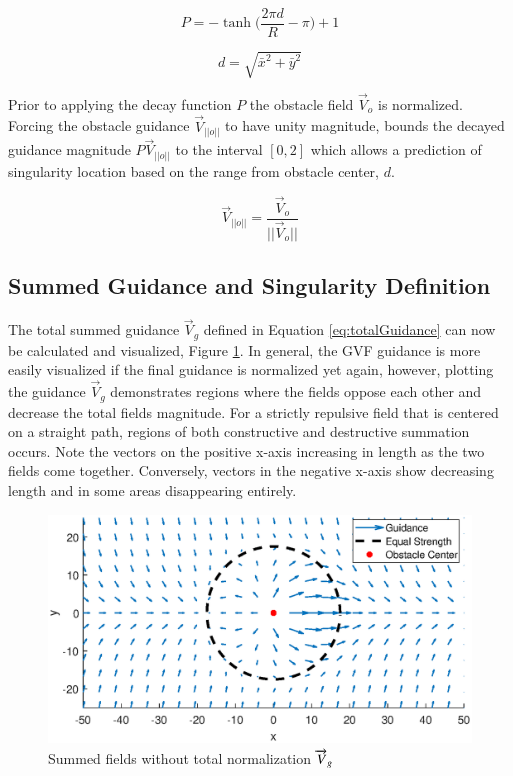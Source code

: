 \documentclass[numbered,pdftex]{ohio-etd}
\begin{document}
\begin{equation}
\label{eq:decay}
P = -\tanh \bigg( \frac{2\pi d}{R}-\pi\bigg)+1
\end{equation}

\begin{equation}
\label{eq:range}
d = \sqrt{ \bar{x}^2+\bar{y}^2}
\end{equation}


Prior to applying the decay function $P$ the obstacle field $\overrightarrow{V}_o$ is normalized. Forcing the obstacle guidance $\overrightarrow{V}_{||o||}$ to have unity magnitude, bounds the decayed guidance magnitude $P\overrightarrow{V}_{||o||}$ to the interval $[0,2]$ which allows a prediction of singularity location based on the range from obstacle center, $d$.


\begin{equation}
\overrightarrow{V}_{||o||} = \frac{\overrightarrow{V}_{o}}{||\overrightarrow{V}_{o}||}
\label{eq:obstNormalized}
\end{equation}


\subsection{Summed Guidance and Singularity Definition}
The total summed guidance $\overrightarrow{V}_g$ defined in Equation \ref{eq:totalGuidance} can now be calculated and visualized, Figure \ref{fig:summedFieldsNoNorm}. In general, the GVF guidance is more easily visualized if the final guidance is normalized yet again, however, plotting the guidance $\overrightarrow{V}_g$ demonstrates regions where the fields oppose each other and decrease the total fields magnitude. For a strictly repulsive field that is centered on a straight path, regions of both constructive and destructive summation occurs. Note the vectors on the positive x-axis increasing in length as the two fields come together. Conversely, vectors in the negative x-axis show decreasing length and in some areas disappearing entirely.  

\begin{figure}[H]
	\centering
	\includegraphics[trim=25 35 25 50,clip,width=14cm]{PaperFigures/Methods/summedFieldsNoNorm}
	\caption{Summed fields without total normalization $\protect \overrightarrow{V}_g$}
	\label{fig:summedFieldsNoNorm}
\end{figure}
\end{document}
